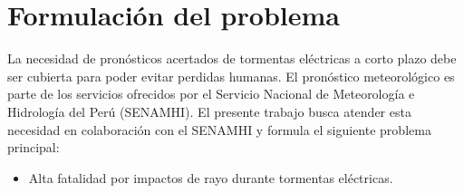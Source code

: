 \section{Formulación del problema}

La necesidad de pronósticos acertados de tormentas eléctricas a corto plazo 
debe ser cubierta para poder evitar perdidas humanas. El pronóstico 
meteorológico es parte de los servicios ofrecidos por el Servicio Nacional de 
Meteorología e Hidrología del Perú (SENAMHI). El presente trabajo busca 
atender esta necesidad en colaboración con el SENAMHI y formula el siguiente 
problema principal:

\begin{itemize}
  \item Alta fatalidad por impactos de rayo durante tormentas eléctricas.
\end{itemize}



